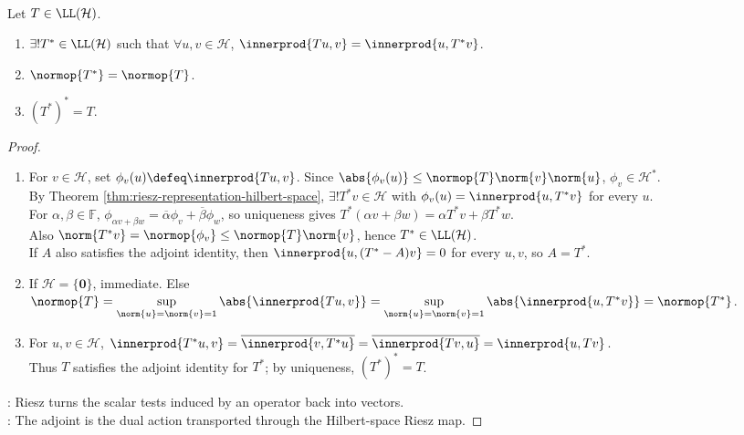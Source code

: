 \begin{theorem} \label{thm:hilbert-adjoint-existence-bounded} \\
Let $T\in\LL(\mathcal{H})$.
\begin{enumerate}[label=(\roman*)]
\setlength{\itemsep}{0pt}
\item $\exists!T^*\in\LL(\mathcal{H})$ such that $\forall u,v\in\mathcal{H}$, $\innerprod{Tu,v}=\innerprod{u,T^*v}$.
\item $\normop{T^*}=\normop{T}$.
\item $(T^*)^*=T$.
\end{enumerate}
\begin{proof}
\begin{enumerate}[label=(\roman*)]
\setlength{\itemsep}{0pt}
\item For $v\in\mathcal{H}$, set $\phi_v(u)\defeq\innerprod{Tu,v}$. Since $\abs{\phi_v(u)}\leq\normop{T}\norm{v}\norm{u}$, $\phi_v\in\mathcal{H}^*$.\\
By Theorem \ref{thm:riesz-representation-hilbert-space}, $\exists!T^*v\in\mathcal{H}$ with $\phi_v(u)=\innerprod{u,T^*v}$ for every $u$.\\
For $\alpha,\beta\in\mathbb F$, $\phi_{\alpha v+\beta w}=\overline{\alpha}\phi_v+\overline{\beta}\phi_w$, so uniqueness gives $T^*(\alpha v+\beta w)=\alpha T^*v+\beta T^*w$.\\
Also $\norm{T^*v}=\normop{\phi_v}\leq\normop{T}\norm{v}$, hence $T^*\in\LL(\mathcal{H})$.\\
If $A$ also satisfies the adjoint identity, then $\innerprod{u,(T^*-A)v}=0$ for every $u,v$, so $A=T^*$.
\item If $\mathcal{H}=\{\mathbf0\}$, immediate. Else $\normop{T}=\sup\limits_{\norm{u}=\norm{v}=1}\abs{\innerprod{Tu,v}}=\sup\limits_{\norm{u}=\norm{v}=1}\abs{\innerprod{u,T^*v}}=\normop{T^*}$.
\item For $u,v\in\mathcal{H}$, $\innerprod{T^*u,v}=\overline{\innerprod{v,T^*u}}=\overline{\innerprod{Tv,u}}=\innerprod{u,Tv}$.\\
Thus $T$ satisfies the adjoint identity for $T^*$; by uniqueness, $(T^*)^*=T$.
\end{enumerate}
: Riesz turns the scalar tests induced by an operator back into vectors.\\
: The adjoint is the dual action transported through the Hilbert-space Riesz map.
\end{proof}
\end{theorem}

